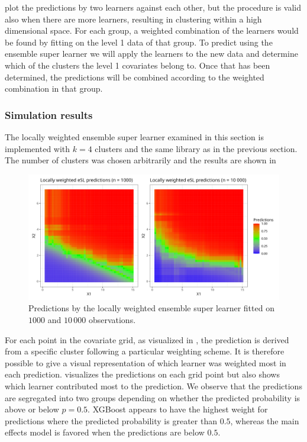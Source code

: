 \documentclass[./main.tex]{subfiles}
\begin{document}
 plot the predictions by two learners against each other, but the procedure is valid also when there are more learners, resulting in clustering within a high dimensional space. For each group, a weighted combination of the learners would be found by fitting on the level 1 data of that group. To predict using the ensemble super learner we will apply the learners to the new data and determine which of the clusters the level 1 covariates belong to. Once that has been determined, the predictions will be combined according to the weighted combination in that group. 

\subsubsection{Simulation results}
The locally weighted ensemble super learner examined in this section is implemented with $ k = 4 $ clusters and the same library as in the previous section. The number of clusters was chosen arbitrarily and the results are shown in 
\begin{figure}[H]
    \centering
    \includegraphics[width=\textwidth]{figures/esl_preds_lw.png}
    \caption{Predictions by the locally weighted ensemble super learner fitted on $ 1000 $ and $ 10\,000 $ observations.}
    \label{fig:esl_preds_lw}
\end{figure}
For each point in the covariate grid, as visualized in , the prediction is derived from a specific cluster following a particular weighting scheme. It is therefore possible to give a visual representation of which learner was weighted most in each prediction.  visualizes the predictions on each grid point but also shows which learner contributed most to the prediction. We observe that the predictions are segregated into two groups depending on whether the predicted probability is above or below $ p = 0.5 $. XGBoost appears to have the highest weight for predictions where the predicted probability is greater than $ 0.5 $, whereas the main effects model is favored when the predictions are below $ 0.5 $. 
\end{document}
